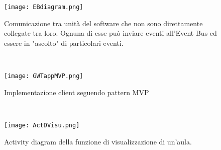 \begin{figure}[!htb]
\centering%
\texttt{[image: EBdiagram.png]}%
\caption{Comunicazione tra unit\`a del software che non sono direttamente collegate tra loro. Ognuna di esse pu\`o inviare eventi all'Event Bus ed essere in "ascolto" di  particolari eventi.}\label{fig:mvpEB}%
\end{figure}\\

\FloatBarrier
\begin{figure}[htbp]
\centering%
\texttt{[image: GWTappMVP.png]}%
\caption{Implementazione client seguendo pattern MVP}\label{fig:mvpApp}%
\end{figure}\\
\begin{figure}[htbp]
\centering%
\texttt{[image: ActDVisu.png]}%
\caption{Activity diagram della funzione di visualizzazione di un'aula.}\label{fig:umlActDVisu}%
\end{figure}
